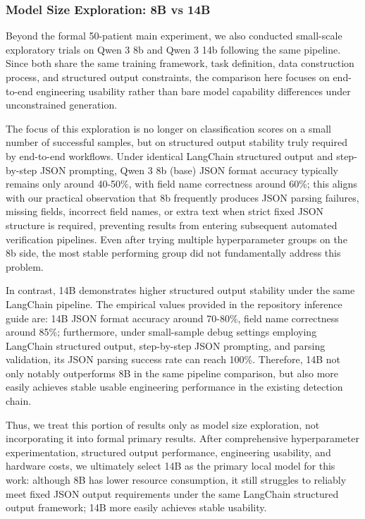 \documentclass[11pt]{article}
\begin{document}
\subsubsection{Model Size Exploration: 8B vs 14B}

Beyond the formal 50-patient main experiment, we also conducted small-scale exploratory trials on Qwen 3 8b and Qwen 3 14b following the same pipeline. Since both share the same training framework, task definition, data construction process, and structured output constraints, the comparison here focuses on end-to-end engineering usability rather than bare model capability differences under unconstrained generation.

The focus of this exploration is no longer on classification scores on a small number of successful samples, but on structured output stability truly required by end-to-end workflows. Under identical LangChain structured output and step-by-step JSON prompting, Qwen 3 8b (base) JSON format accuracy typically remains only around 40-50\%, with field name correctness around 60\%; this aligns with our practical observation that 8b frequently produces JSON parsing failures, missing fields, incorrect field names, or extra text when strict fixed JSON structure is required, preventing results from entering subsequent automated verification pipelines. Even after trying multiple hyperparameter groups on the 8b side, the most stable performing group did not fundamentally address this problem.

In contrast, 14B demonstrates higher structured output stability under the same LangChain pipeline. The empirical values provided in the repository inference guide are: 14B JSON format accuracy around 70-80\%, field name correctness around 85\%; furthermore, under small-sample debug settings employing LangChain structured output, step-by-step JSON prompting, and parsing validation, its JSON parsing success rate can reach 100\%. Therefore, 14B not only notably outperforms 8B in the same pipeline comparison, but also more easily achieves stable usable engineering performance in the existing detection chain.

Thus, we treat this portion of results only as model size exploration, not incorporating it into formal primary results. After comprehensive hyperparameter experimentation, structured output performance, engineering usability, and hardware costs, we ultimately select 14B as the primary local model for this work: although 8B has lower resource consumption, it still struggles to reliably meet fixed JSON output requirements under the same LangChain structured output framework; 14B more easily achieves stable usability.
\end{document}
